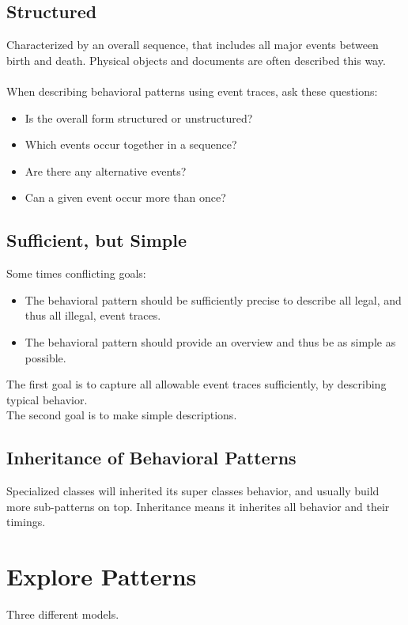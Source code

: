 \subsection*{Structured}
Characterized by an overall sequence, that includes all major events between birth and death. Physical objects and documents are often described this way.
\\\\
When describing behavioral patterns using event traces, ask these questions:
\begin{itemize}
    \item Is the overall form structured or unstructured?
    \item Which events occur together in a sequence?
    \item Are there any alternative events?
    \item Can a given event occur more than once?
\end{itemize}

\subsection*{Sufficient, but Simple \ooad[100]}
Some times conflicting goals:
\begin{itemize}
    \item The behavioral pattern should be sufficiently precise to describe all legal, and thus all illegal, event traces.
    \item The behavioral pattern should provide an overview and thus be as simple as possible.
\end{itemize}
The first goal is to capture all allowable event traces sufficiently, by describing typical behavior.\\
The second goal is to make simple descriptions.
\subsection*{Inheritance of Behavioral Patterns \ooad[102]}
Specialized classes will inherited its super classes behavior, and usually build more sub-patterns on top. Inheritance means it inherites all behavior and their timings.

\section{Explore Patterns \ooad[104]}
Three different models.

